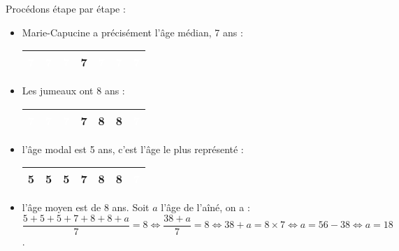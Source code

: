 Procédons étape par étape :
   \begin{itemize}
      \item Marie-Capucine a précisément l'âge médian, 7 ans :
      \begin{tabular}{|*{7}{C{0.4}|}}
         \hline
         \textcolor{white}{7} & \textcolor{white}{7} & \textcolor{white}{7} & 7 & \textcolor{white}{7} & \textcolor{white}{7} & \textcolor{white}{7} \\
         \hline
      \end{tabular}
      \smallskip
      \item Les jumeaux ont 8 ans :
       \begin{tabular}{|*{7}{C{0.4}|}}
         \hline
         \textcolor{white}{7} & \textcolor{white}{7} & \textcolor{white}{7} & 7 & 8 & 8 & \textcolor{white}{7} \\
         \hline
      \end{tabular}
      \smallskip
      \item l'âge modal est 5 ans, c'est l'âge le plus représenté :
       \begin{tabular}{|*{7}{C{0.4}|}}
          & 5 & 5 & 7 & 8 & 8 & \textcolor{white}{7} \\
         \hline
      \end{tabular}
      \smallskip
      \item l'âge moyen est de 8 ans. Soit $a$ l'âge de l'aîné, on a : \\ [1mm]
      $\dfrac{5+5+5+7+8+8+a}{7} =8 \iff \dfrac{38+a}{7} =8 \iff 38+a =8\times7 \iff a =56-38 \iff a =18$. \\ [1mm]
    \end{itemize}
    \\
